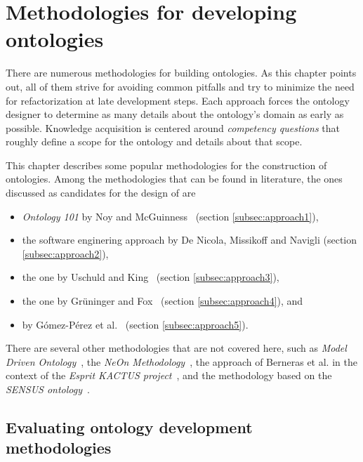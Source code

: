 \chapter{Methodologies for developing ontologies}
\label{ch:development_approaches}

There are numerous methodologies for building ontologies. As this chapter points out, all of them strive for avoiding common pitfalls and try to minimize the need for refactorization at late development steps. Each approach forces the ontology designer to determine as many details about the ontology's domain as early as possible. Knowledge acquisition is centered around \emph{competency questions} that roughly define a scope for the ontology and details about that scope. 

This chapter describes some popular methodologies for the construction of ontologies. Among the methodologies that can be found in literature, the ones discussed as candidates for the design of \thinkhomeweather are

\begin{itemize}
  \item \emph{Ontology 101} by Noy and McGuinness~\cite{Ontology101} (section \ref{subsec:approach1}),

  \item the software enginering approach by De Nicola, Missikoff and Navigli \cite{SoftwareEngineeringOntology} (section \ref{subsec:approach2}),
  
  \item the one by Uschuld and King~\cite{UscholdKing} (section \ref{subsec:approach3}),
  
  \item the one by Grüninger and Fox~\cite{GruningerFox} (section \ref{subsec:approach4}), and
  
  \item \methontology by Gómez-Pérez et al.~\cite{Methontology} (section \ref{subsec:approach5}).
\end{itemize}

There are several other methodologies that are not covered here, such as \emph{Model Driven Ontology}~\cite{ModelDrivenOntology}, the \emph{NeOn Methodology}~\cite{NeOnMethodology}, the approach of Berneras et al. in the context of the \emph{Esprit KACTUS project}~\cite{KACTUSMethodology}, and the methodology based on the \emph{SENSUS ontology}~\cite{SENSUSMethodology}.


\section{Evaluating ontology development methodologies}

